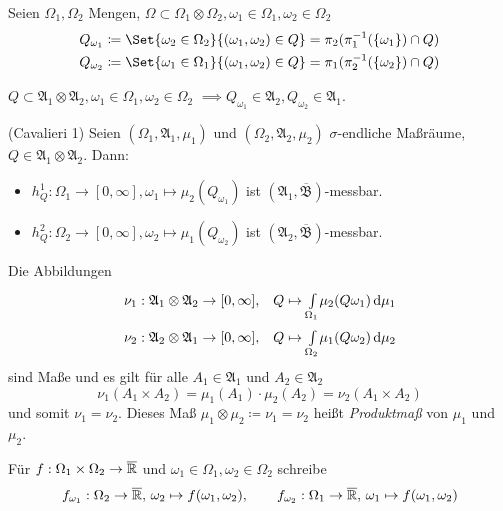 \documentclass{cheat-sheet}
\newcommand{\ER}{\overline\R} %
\newcommand{\Alg}{\mathfrak{A}} %
\newcommand{\Bor}{\mathfrak{B}} %
\begin{document}
\begin{nota}
  Seien $\Omega_1, \Omega_2$ Mengen, $\Omega \subset \Omega_1 \otimes \Omega_2, \omega_1 \in \Omega_1, \omega_2 \in \Omega_2$
  \begin{align*}
    Q_{\omega_1} &\coloneqq \Set{ \omega_2 \in \Omega_2 }{ (\omega_1, \omega_2) \in Q } = \pi_2(\pi_1^{-1}(\{ \omega_1 \}) \cap Q)\\
    Q_{\omega_2} &\coloneqq \Set{ \omega_1 \in \Omega_1 }{ (\omega_1, \omega_2) \in Q } = \pi_1(\pi_2^{-1}(\{ \omega_2 \}) \cap Q)
  \end{align*}
\end{nota}

\begin{satz} %
  $Q \subset \Alg_1 \otimes \Alg_2, \omega_1 \in \Omega_1, \omega_2 \in \Omega_2$
  $\implies Q_{\omega_1} \in \Alg_2, Q_{\omega_2} \in \Alg_1$.
\end{satz}

\begin{satz}(Cavalieri 1) %
  Seien $(\Omega_1, \Alg_1, \mu_1)$ und $(\Omega_2, \Alg_2, \mu_2)$ $\sigma$-endliche Maßräume, $Q \in \Alg_1 \otimes \Alg_2$. Dann:
  \begin{itemize}
    \item $h_Q^1 : \Omega_1 \to [0, \infty], \omega_1 \mapsto \mu_2(Q_{\omega_1})$ ist $(\Alg_1, \overline{\Bor})$-messbar.
    \item $h_Q^2 : \Omega_2 \to [0, \infty], \omega_2 \mapsto \mu_1(Q_{\omega_2})$ ist $(\Alg_2, \overline{\Bor})$-messbar.
  \end{itemize}
\end{satz}

\begin{satz}
  Die Abbildungen
  \begin{align*}
    \nu_1 : \Alg_1 \otimes \Alg_2 \to [0, \infty], \quad & Q \mapsto \Int{\Omega_1}{}{\mu_2(Q \omega_1)}{\mu_1} \\
    \nu_2 : \Alg_2 \otimes \Alg_1 \to [0, \infty], \quad & Q \mapsto \Int{\Omega_2}{}{\mu_1(Q \omega_2)}{\mu_2}
  \end{align*}
  sind Maße und es gilt für alle $A_1 \in \Alg_1$ und $A_2 \in \Alg_2$
  \[ \nu_1(A_1 \times A_2) = \mu_1(A_1) \cdot \mu_2(A_2) = \nu_2(A_1 \times A_2) \]
  und somit $\nu_1 = \nu_2$. Dieses Maß $\mu_1 \otimes \mu_2 \coloneqq \nu_1 = \nu_2$ heißt \emph{Produktmaß} von $\mu_1$ und $\mu_2$.
\end{satz}

\begin{nota}
  Für $f : \Omega_1 \times \Omega_2 \to \ER$ und $\omega_1 \in \Omega_1, \omega_2 \in \Omega_2$ schreibe
  \begin{align*}
    f_{\omega_1} : \Omega_2 \to \ER, \, \omega_2 \mapsto f(\omega_1, \omega_2), \qquad
    f_{\omega_2} : \Omega_1 \to \ER, \, \omega_1 \mapsto f(\omega_1, \omega_2)
  \end{align*}
\end{nota}
\end{document}
